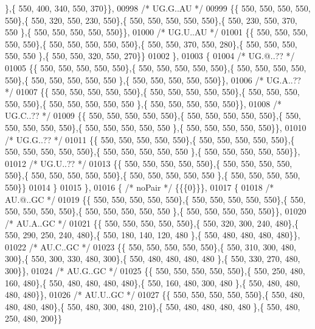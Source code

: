 \begin{DoxyCode}
      \},\{ 550, 400, 340, 550, 370\}\},
00998 \textcolor{comment}{/* UG.G..AU */}
00999 \{\{ 550, 550, 550, 550, 550\},\{ 550, 320, 550, 230, 550\},\{ 550, 550, 550, 550, 550\},\{ 550, 230, 550, 370, 550
      \},\{ 550, 550, 550, 550, 550\}\},
01000 \textcolor{comment}{/* UG.U..AU */}
01001 \{\{ 550, 550, 550, 550, 550\},\{ 550, 550, 550, 550, 550\},\{ 550, 550, 370, 550, 280\},\{ 550, 550, 550, 550, 550
      \},\{ 550, 550, 320, 550, 270\}\}
01002 \},
01003 \{
01004 \textcolor{comment}{/* UG.@..?? */}
01005 \{\{ 550, 550, 550, 550, 550\},\{ 550, 550, 550, 550, 550\},\{ 550, 550, 550, 550, 550\},\{ 550, 550, 550, 550, 550
      \},\{ 550, 550, 550, 550, 550\}\},
01006 \textcolor{comment}{/* UG.A..?? */}
01007 \{\{ 550, 550, 550, 550, 550\},\{ 550, 550, 550, 550, 550\},\{ 550, 550, 550, 550, 550\},\{ 550, 550, 550, 550, 550
      \},\{ 550, 550, 550, 550, 550\}\},
01008 \textcolor{comment}{/* UG.C..?? */}
01009 \{\{ 550, 550, 550, 550, 550\},\{ 550, 550, 550, 550, 550\},\{ 550, 550, 550, 550, 550\},\{ 550, 550, 550, 550, 550
      \},\{ 550, 550, 550, 550, 550\}\},
01010 \textcolor{comment}{/* UG.G..?? */}
01011 \{\{ 550, 550, 550, 550, 550\},\{ 550, 550, 550, 550, 550\},\{ 550, 550, 550, 550, 550\},\{ 550, 550, 550, 550, 550
      \},\{ 550, 550, 550, 550, 550\}\},
01012 \textcolor{comment}{/* UG.U..?? */}
01013 \{\{ 550, 550, 550, 550, 550\},\{ 550, 550, 550, 550, 550\},\{ 550, 550, 550, 550, 550\},\{ 550, 550, 550, 550, 550
      \},\{ 550, 550, 550, 550, 550\}\}
01014 \}
01015 \},
01016 \{ \textcolor{comment}{/* noPair */} \{\{\{0\}\}\},
01017 \{
01018 \textcolor{comment}{/* AU.@..GC */}
01019 \{\{ 550, 550, 550, 550, 550\},\{ 550, 550, 550, 550, 550\},\{ 550, 550, 550, 550, 550\},\{ 550, 550, 550, 550, 550
      \},\{ 550, 550, 550, 550, 550\}\},
01020 \textcolor{comment}{/* AU.A..GC */}
01021 \{\{ 550, 550, 550, 550, 550\},\{ 550, 320, 300, 240, 480\},\{ 550, 290, 250, 240, 480\},\{ 550, 180, 140, 120, 480
      \},\{ 550, 480, 480, 480, 480\}\},
01022 \textcolor{comment}{/* AU.C..GC */}
01023 \{\{ 550, 550, 550, 550, 550\},\{ 550, 310, 300, 480, 300\},\{ 550, 300, 330, 480, 300\},\{ 550, 480, 480, 480, 480
      \},\{ 550, 330, 270, 480, 300\}\},
01024 \textcolor{comment}{/* AU.G..GC */}
01025 \{\{ 550, 550, 550, 550, 550\},\{ 550, 250, 480, 160, 480\},\{ 550, 480, 480, 480, 480\},\{ 550, 160, 480, 300, 480
      \},\{ 550, 480, 480, 480, 480\}\},
01026 \textcolor{comment}{/* AU.U..GC */}
01027 \{\{ 550, 550, 550, 550, 550\},\{ 550, 480, 480, 480, 480\},\{ 550, 480, 300, 480, 210\},\{ 550, 480, 480, 480, 480
      \},\{ 550, 480, 250, 480, 200\}\}

\end{DoxyCode}
